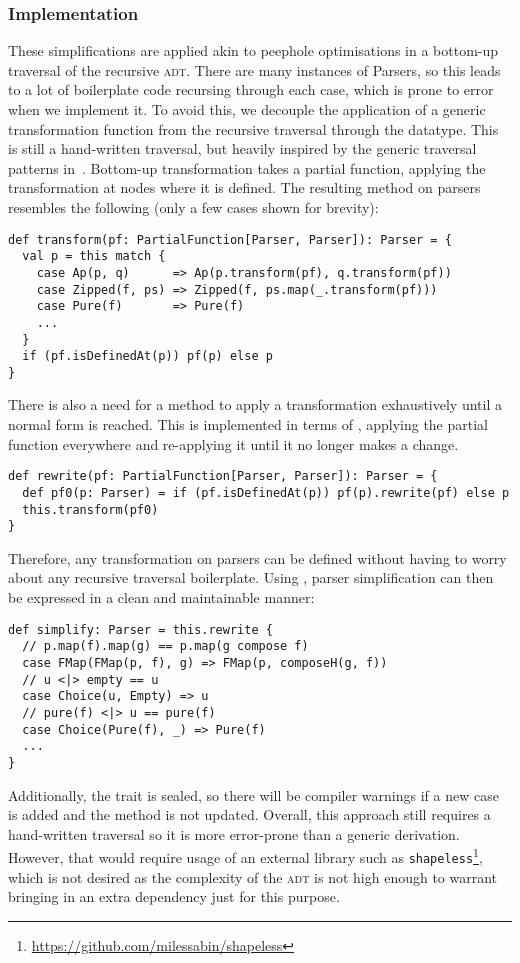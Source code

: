 \documentclass[../../main.tex]{subfiles}
\begin{document}
\subsubsection{Implementation}
These simplifications are applied akin to peephole optimisations in a bottom-up traversal of the recursive  \textsc{adt}.
There are many instances of Parsers, so this leads to a lot of boilerplate code recursing through each case, which is prone to error when we implement it.
To avoid this, we decouple the application of a generic transformation function from the recursive traversal through the datatype.
This is still a hand-written traversal, but heavily inspired by the generic traversal patterns in~\cite{mitchell_uniform_2007}.
Bottom-up transformation takes a partial function, applying the transformation at nodes where it is defined.
The resulting  method on parsers resembles the following (only a few cases shown for brevity):
\begin{verbatim}
def transform(pf: PartialFunction[Parser, Parser]): Parser = {
  val p = this match {
    case Ap(p, q)      => Ap(p.transform(pf), q.transform(pf))
    case Zipped(f, ps) => Zipped(f, ps.map(_.transform(pf)))
    case Pure(f)       => Pure(f)
    ...
  }
  if (pf.isDefinedAt(p)) pf(p) else p
}
\end{verbatim}
%
There is also a need for a  method to apply a transformation exhaustively until a normal form is reached.
This is implemented in terms of , applying the partial function everywhere and re-applying it until it no longer makes a change.
\begin{verbatim}
def rewrite(pf: PartialFunction[Parser, Parser]): Parser = {
  def pf0(p: Parser) = if (pf.isDefinedAt(p)) pf(p).rewrite(pf) else p
  this.transform(pf0)
}
\end{verbatim}
%
Therefore, any transformation on parsers can be defined without having to worry about any recursive traversal boilerplate.
Using , parser simplification can then be expressed in a clean and maintainable manner:
\begin{verbatim}
def simplify: Parser = this.rewrite {
  // p.map(f).map(g) == p.map(g compose f)
  case FMap(FMap(p, f), g) => FMap(p, composeH(g, f))
  // u <|> empty == u
  case Choice(u, Empty) => u
  // pure(f) <|> u == pure(f)
  case Choice(Pure(f), _) => Pure(f)
  ...
}
\end{verbatim}
%
Additionally, the  trait is sealed, so there will be compiler warnings if a new case is added and the  method is not updated.
Overall, this approach still requires a hand-written traversal so it is more error-prone than a generic derivation.
However, that would require usage of an external library such as \texttt{shapeless}\footnote{\url{https://github.com/milessabin/shapeless}},
which is not desired as the complexity of the \textsc{adt} is not high enough to warrant bringing in an extra dependency just for this purpose.
\end{document}
